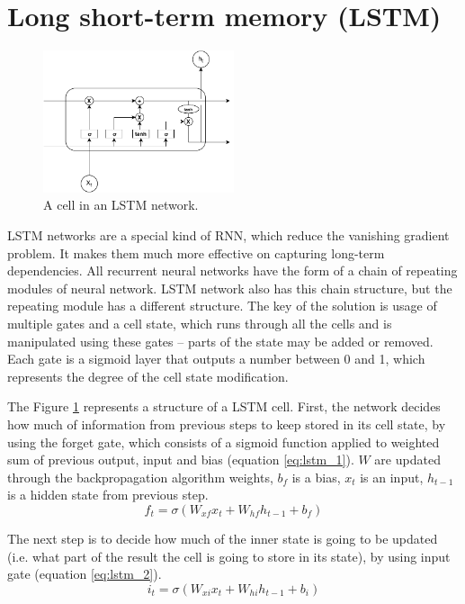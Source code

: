 \section{Long short-term memory (LSTM)} \label{lstm_section}

\begin{figure}[hbt]
  \centering
  \includegraphics[width=0.5\textwidth]{figures/lstmCell.pdf}
  \caption{A cell in an LSTM network.}
  \label{lstm}
\end{figure}

LSTM networks are a special kind of RNN, which reduce the vanishing gradient problem. It makes them much more effective on capturing long-term dependencies. All recurrent neural networks have the form of a chain of repeating modules of neural network. LSTM network also has this chain structure, but the repeating module has a different structure. The key of the solution is usage of multiple gates and a cell state, which runs through all the cells and is manipulated using these gates – parts of the state may be added or removed. Each gate is a sigmoid layer that outputs a number between 0 and 1, which represents the degree of the cell state modification.

The Figure \ref{lstm} represents a structure of a LSTM cell. First, the network decides how much of information from previous steps to keep stored in its cell state, by using the forget gate, which consists of a sigmoid function applied to weighted sum of previous output, input and bias (equation \ref{eq:lstm_1}). $W$ are updated through the backpropagation algorithm weights, $b_f$ is a bias, $x_t$ is an input, $h_{t-1}$ is a hidden state from previous step.
\begin{equation} \label{eq:lstm_1}
f_t = \sigma(W_{xf}x_t + W_{hf}h_{t-1}+b_f)
\end{equation}

The next step is to decide how much of the inner state is going to be updated (i.e. what part of the result the cell is going to store in its state), by using input gate (equation \ref{eq:lstm_2}).
\begin{equation} \label{eq:lstm_2}
i_t = \sigma(W_{xi}x_t + W_{hi}h_{t-1}+b_i)
\end{equation}

